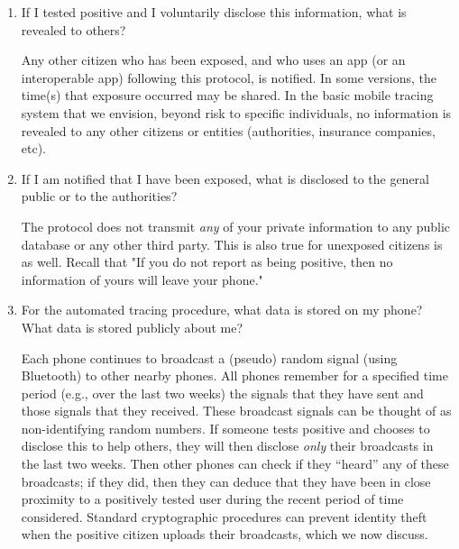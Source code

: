 \documentclass{article}
\newcommand{\TODO}[1]{ {\color{blue} #1 }}
\begin{document}
\begin{enumerate}[leftmargin=*]
\item If I tested positive and I voluntarily disclose this information, what is revealed to others?

Any other citizen who has been exposed, and who uses an app (or an interoperable app) following this protocol, is notified. In some versions, the time(s) that exposure occurred may be shared.  In the basic mobile tracing system that we envision, beyond risk to specific individuals, no information is revealed to any other citizens or entities (authorities, insurance companies, etc). 

\item If I am notified that I have been exposed, what is disclosed to the general public or to the authorities? 
 
The protocol does not transmit \emph{any} of your private information to any public database or any other third party. This is also true for unexposed citizens is as well. Recall that "If you do not report as being positive, then no information of yours will leave your phone."

\item For the automated tracing procedure, what data is stored on my phone? What data is stored publicly about me?

Each phone continues to broadcast a (pseudo) random signal (using Bluetooth) to other nearby phones. All phones remember for a specified time period (e.g., over the last two weeks) the signals that they have sent and those signals that they received. These broadcast signals can be thought of as non-identifying random numbers. 
If someone tests positive and chooses to disclose this to help others, they will then disclose \emph{only} their broadcasts in the last two weeks. Then other phones can check if they ``heard'' any of these broadcasts; if they did, then they can deduce that they have been in close proximity to a positively tested user during the recent period of time considered.  Standard cryptographic procedures can prevent identity theft when the positive citizen uploads their broadcasts, which we now discuss.

\iffalse
\item Is any of my location information ever broadcast to the world?

No location information ever leaves your phone in the mobile-tracing protocol.  This is one advantage of this particular Bluetooth ``beacon-based" approach.  One could alternatively design GPS-centric approaches to mobile-tracing. With this approach, all individuals' location information would have to leave their phones; the approach would have to rely on secure cryptography for privacy.
\fi

\end{enumerate}
\end{document}
